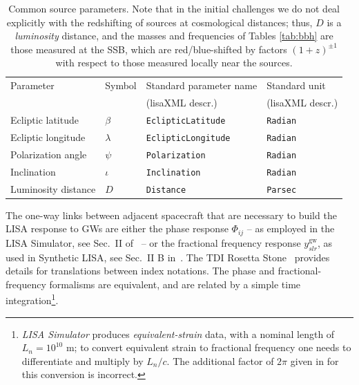\documentclass[12pt]{iopart}
\begin{document}
\begin{table}
\begin{tabular}{llll}
\hline
{Parameter} &
{Symbol} &
{Standard parameter name} &
{Standard unit} \\
& & (lisaXML descr.) & (lisaXML descr.) \\
\hline
Ecliptic latitude   & $\beta$   & \texttt{EclipticLatitude}  & \texttt{Radian} \\
Ecliptic longitude  & $\lambda$ & \texttt{EclipticLongitude} & \texttt{Radian} \\
Polarization angle  & $\psi$    & \texttt{Polarization}      & \texttt{Radian} \\
Inclination         & $\iota$   & \texttt{Inclination}       & \texttt{Radian} \\
Luminosity distance & $D$       & \texttt{Distance}          & \texttt{Parsec} \\
\hline
\end{tabular}
\caption{Common source parameters. Note that in the initial challenges we do not deal explicitly with the redshifting of sources at cosmological distances; thus, $D$ is a \emph{luminosity} distance, and the masses and frequencies of Tables \ref{tab:bbh} are those measured at the SSB, which are red/blue-shifted by factors $(1+z)^{\pm 1}$ with respect to those measured locally near the sources.\label{tab:common}}
\end{table}

The one-way links between adjacent spacecraft that are necessary to build the LISA response to GWs are either the phase response $\Phi_{ij}$ -- as employed in the LISA Simulator, see Sec.\ II of~\cite{lisasimulator} -- or the fractional frequency response $y^\mathrm{gw}_{slr}$, as used in Synthetic LISA, see Sec.\ II B in~\cite{synthlisa}. The TDI Rosetta Stone~\cite{rosetta} provides details for translations between index notations. The phase and fractional-frequency formalisms are equivalent, and are related by a simple time integration\footnote{\emph{LISA Simulator} produces \emph{equivalent-strain} data, with a nominal length of $L_n = 10^{10}$ m; to convert equivalent strain to fractional frequency one needs to differentiate and multiply by $L_n / c$. The additional factor of $2 \pi$ given in \cite{MLDCLISA06b} for this conversion is incorrect.}.
\end{document}
